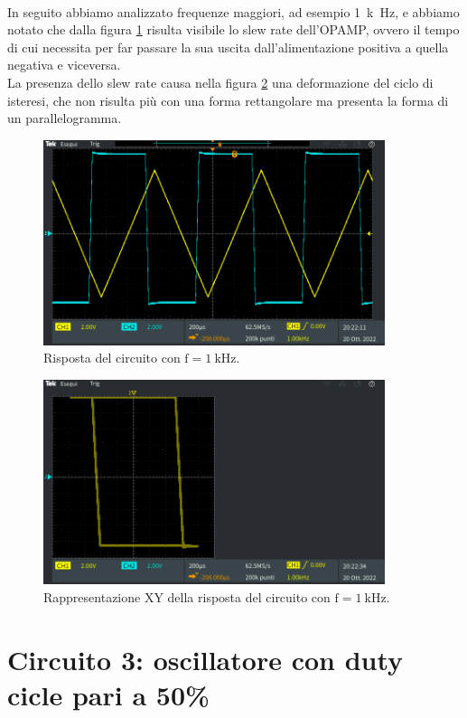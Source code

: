 \documentclass{report}
\begin{document}
\\In seguito abbiamo analizzato frequenze maggiori, ad esempio \SI{1}{k\hertz}, e abbiamo notato che dalla figura \ref{figura:uscita23} risulta visibile lo slew rate dell'OPAMP, ovvero il tempo di cui necessita per far passare la sua uscita dall'alimentazione positiva a quella negativa e viceversa.
\\La presenza dello slew rate causa nella figura \ref{figura:uscita24} una deformazione del ciclo di isteresi, che non risulta più con una forma rettangolare ma presenta la forma di un parallelogramma.
\begin{figure}[h!]
	\centering
	\includegraphics[height=6cm]{immagini/TEK00020}
	\caption{Risposta del circuito con $\mathrm{f= \SI{1}{k\hertz}}$.}
	\label{figura:uscita23}
\end{figure}
\begin{figure}[h!]
	\centering
	\includegraphics[height=6cm]{immagini/TEK00022}
	\caption{Rappresentazione XY della risposta del circuito con $\mathrm{f= \SI{1}{k\hertz}}$.}
	\label{figura:uscita24}
\end{figure}

\newpage\null\newpage %
\section{Circuito 3: oscillatore con duty cicle pari a 50\%}
\end{document}
